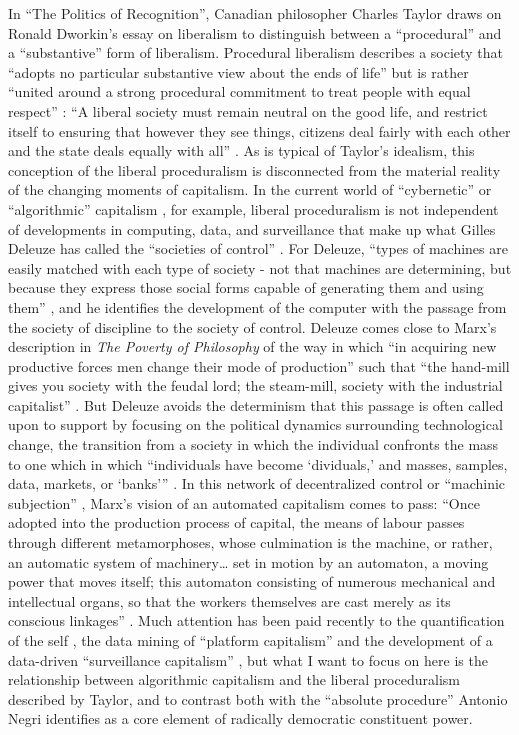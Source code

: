 \documentclass[12pt,oneside]{memoir}
\begin{document}
In ``The Politics of Recognition'', Canadian philosopher Charles Taylor draws on Ronald Dworkin's essay on liberalism to distinguish between a ``procedural'' and a ``substantive'' form of liberalism. Procedural liberalism describes a society that ``adopts no particular substantive view about the ends of life'' but is rather ``united around a strong procedural commitment to treat people with equal respect'' \cite[56]{Taylor1994}: ``A liberal society must remain neutral on the good life, and restrict itself to ensuring that however they see things, citizens deal fairly with each other and the state deals equally with all'' \citep[57]{Taylor1994}. As is typical of Taylor's idealism, this conception of the liberal proceduralism is disconnected from the material reality of the changing moments of capitalism. In the current world of ``cybernetic'' or ``algorithmic'' capitalism \citep{DyerWitheford2015, Parisi2015}, for example, liberal proceduralism is not independent of developments in computing, data, and surveillance that make up what Gilles Deleuze has called the ``societies of control'' \citep{Deleuze1992}. For Deleuze, ``types of machines are easily matched with each type of society - not that machines are determining, but because they express those social forms capable of generating them and using them'' \citep[6]{Deleuze1992}, and he identifies the development of the computer with the passage from the society of discipline to the society of control. Deleuze comes close to Marx's description in \emph{The Poverty of Philosophy} of the way in which ``in acquiring new productive forces men change their mode of production'' such that ``the hand-mill gives you society with the feudal lord; the steam-mill, society with the industrial capitalist'' \citep[95]{Marx1955}. But Deleuze avoids the determinism that this passage is often called upon to support by focusing on the political dynamics surrounding technological change, the transition from a society in which the individual confronts the mass to one which in which ``individuals have become `dividuals,' and masses, samples, data, markets, or `banks''' \citep[5]{Deleuze1992}. In this network of decentralized control or ``machinic  subjection'' \citep{Lazzarato2012}, Marx's vision of an automated capitalism comes to pass: ``Once adopted into the production process of capital, the means of labour passes through different metamorphoses, whose culmination is the machine, or rather, an automatic system of machinery{\ldots} set in motion by an automaton, a moving power that moves itself; this automaton consisting of numerous mechanical and intellectual organs, so that the workers themselves are cast merely as its conscious linkages'' \citep[692]{Marx1973}. Much attention has been paid recently to the quantification of the self \citep{Moore2017}, the data mining of ``platform capitalism'' \citep{Srnicek2016} and the development of a data-driven ``surveillance capitalism'' \citep{Zuboff2019}, but what I want to focus on here is the relationship between algorithmic capitalism and the liberal proceduralism described by Taylor, and to contrast both with the ``absolute procedure'' Antonio Negri identifies as a core element of radically democratic constituent power. 
	
\end{document}
